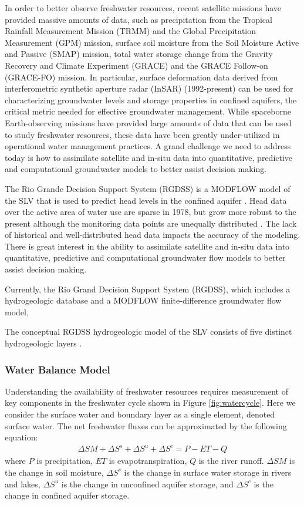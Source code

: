 In order to better observe freshwater resources, recent satellite missions have provided massive amounts of data, such as precipitation from the Tropical Rainfall Measurement Mission (TRMM) and the Global Precipitation Measurement (GPM) mission, surface soil moisture from the Soil Moisture Active and Passive (SMAP) mission, total water storage change from the Gravity Recovery and Climate Experiment (GRACE) and the GRACE Follow-on (GRACE-FO) mission. In particular, surface deformation data derived from interferometric synthetic aperture radar (InSAR) (1992-present) can be used for characterizing groundwater levels and storage properties in confined aquifers, the critical metric needed for effective groundwater management. While spaceborne Earth-observing missions have provided large amounts of data that can be used to study freshwater resources, these data have been greatly under-utilized in operational water management practices. A grand challenge we need to address today is how to assimilate satellite and in-situ data into quantitative, predictive and computational groundwater models to better assist decision making.

The Rio Grande Decision Support System (RGDSS) is a MODFLOW model of the SLV that is used to predict head levels in the confined aquifer  .  Head data over the active area of water use are sparse in 1978, but grow more robust to the present although the monitoring data points are unequally distributed . The lack of historical and well-distributed head data impacts the accuracy of the modeling.  There is great interest in the ability to assimilate satellite and in-situ data into quantitative, predictive and computational groundwater flow models to better assist decision making.

Currently, the Rio Grand Decision Support System (RGDSS), which includes a hydrogeologic database and a MODFLOW finite-difference groundwater flow model, 

The conceptual RGDSS hydrogeologic model of the SLV consists of five distinct hydrogeologic layers \citep{RGDSS}. 


\subsubsection{Water Balance Model}
Understanding the availability of freshwater resources requires measurement of key components in the freshwater cycle shown in Figure \ref{fig:watercycle}. Here we consider the surface water and boundary layer as a single element, denoted surface water. The net freshwater fluxes can be approximated by the following equation:
\begin{align}
\Delta SM +\Delta S^s +\Delta S^u + \Delta S^c = P-ET-Q
\label{eq:waterBalance}  
\end{align}
where $P$ is precipitation, $ET$ is evapotranspiration, $Q$ is the river runoff. $\Delta SM$ is the change in soil moisture, $\Delta S^s$ is the change in surface water storage in rivers and lakes, $\Delta S^u$ is the change in unconfined aquifer storage, and $\Delta S^c$  is the change in confined aquifer storage.

